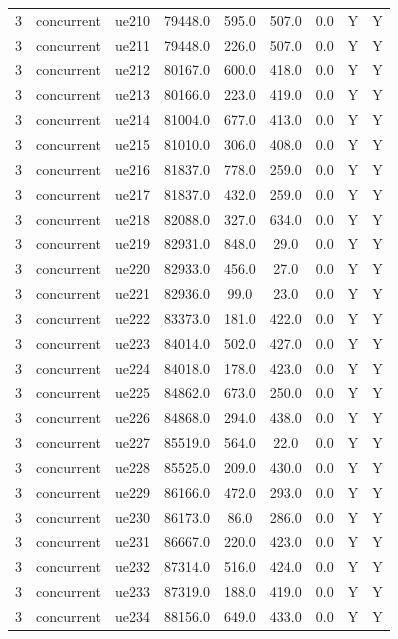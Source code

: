 \begin{table}[ht]
\begin{tabular}{|c|c|c|c|c|c|c|c|c|}
3 & concurrent & ue210 & 79448.0 & 595.0 & 507.0 & 0.0 & Y & Y \\
3 & concurrent & ue211 & 79448.0 & 226.0 & 507.0 & 0.0 & Y & Y \\
3 & concurrent & ue212 & 80167.0 & 600.0 & 418.0 & 0.0 & Y & Y \\
3 & concurrent & ue213 & 80166.0 & 223.0 & 419.0 & 0.0 & Y & Y \\
3 & concurrent & ue214 & 81004.0 & 677.0 & 413.0 & 0.0 & Y & Y \\
3 & concurrent & ue215 & 81010.0 & 306.0 & 408.0 & 0.0 & Y & Y \\
3 & concurrent & ue216 & 81837.0 & 778.0 & 259.0 & 0.0 & Y & Y \\
3 & concurrent & ue217 & 81837.0 & 432.0 & 259.0 & 0.0 & Y & Y \\
3 & concurrent & ue218 & 82088.0 & 327.0 & 634.0 & 0.0 & Y & Y \\
3 & concurrent & ue219 & 82931.0 & 848.0 & 29.0 & 0.0 & Y & Y \\
3 & concurrent & ue220 & 82933.0 & 456.0 & 27.0 & 0.0 & Y & Y \\
3 & concurrent & ue221 & 82936.0 & 99.0 & 23.0 & 0.0 & Y & Y \\
3 & concurrent & ue222 & 83373.0 & 181.0 & 422.0 & 0.0 & Y & Y \\
3 & concurrent & ue223 & 84014.0 & 502.0 & 427.0 & 0.0 & Y & Y \\
3 & concurrent & ue224 & 84018.0 & 178.0 & 423.0 & 0.0 & Y & Y \\
3 & concurrent & ue225 & 84862.0 & 673.0 & 250.0 & 0.0 & Y & Y \\
3 & concurrent & ue226 & 84868.0 & 294.0 & 438.0 & 0.0 & Y & Y \\
3 & concurrent & ue227 & 85519.0 & 564.0 & 22.0 & 0.0 & Y & Y \\
3 & concurrent & ue228 & 85525.0 & 209.0 & 430.0 & 0.0 & Y & Y \\
3 & concurrent & ue229 & 86166.0 & 472.0 & 293.0 & 0.0 & Y & Y \\
3 & concurrent & ue230 & 86173.0 & 86.0 & 286.0 & 0.0 & Y & Y \\
3 & concurrent & ue231 & 86667.0 & 220.0 & 423.0 & 0.0 & Y & Y \\
3 & concurrent & ue232 & 87314.0 & 516.0 & 424.0 & 0.0 & Y & Y \\
3 & concurrent & ue233 & 87319.0 & 188.0 & 419.0 & 0.0 & Y & Y \\
3 & concurrent & ue234 & 88156.0 & 649.0 & 433.0 & 0.0 & Y & Y \\

\end{tabular}
\end{table}
